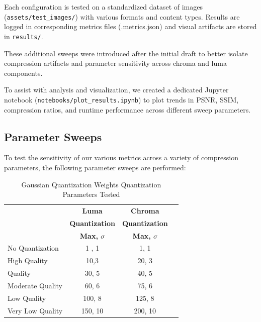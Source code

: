 Each configuration is tested on a standardized dataset of images (\texttt{assets/test\_images/}) with various formats and content types. Results are logged in corresponding metrics files (.metrics.json) and visual artifacts are stored in \texttt{results/}.

These additional sweeps were introduced after the initial draft to better isolate compression artifacts and parameter sensitivity across chroma and luma components.

To assist with analysis and visualization, we created a dedicated Jupyter notebook (\texttt{notebooks/plot\_results.ipynb}) to plot trends in PSNR, SSIM, compression ratios, and runtime performance across different sweep parameters.

\subsection{Parameter Sweeps}

To test the sensitivity of our various metrics across a variety of compression parameters, the following parameter sweeps are performed:

\begin{table}[h!]
    \centering
    \caption{Gaussian Quantization Weights Quantization Parameters Tested}
    \begin{tabularx}{0.5\textwidth}{X c c c}
        \toprule
        \ & \textbf{Luma} & \textbf{Chroma} \\
        \ & \textbf{Quantization} & \textbf{Quantization} \\
        \ & \textbf{Max, $\sigma$} & \textbf{Max, $\sigma$} \\
        \midrule
        No Quantization & 1 , 1 & 1, 1 \\
        High Quality & 10,3 & 20, 3 \\
        Quality & 30, 5 & 40, 5 \\
        Moderate Quality & 60, 6 & 75, 6 \\
        Low Quality & 100, 8 & 125, 8 \\
        Very Low Quality & 150, 10 & 200, 10 \\
        \bottomrule
    \end{tabularx}
    \label{tab:Quantization-Parameters-Table}
\end{table}

